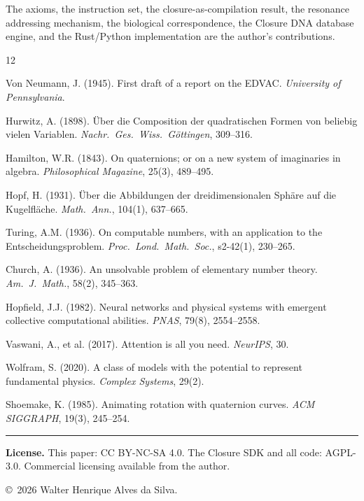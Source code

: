 \documentclass[12pt,a4paper]{article}
\begin{document}
The axioms, the instruction set, the closure-as-compilation result, the resonance addressing mechanism, the biological correspondence, the Closure DNA database engine, and the Rust/Python implementation are the author's contributions.


\begin{thebibliography}{12}

Von Neumann, J. (1945). First draft of a report on the EDVAC. \textit{University of Pennsylvania}.

Hurwitz, A. (1898). \"{U}ber die Composition der quadratischen Formen von beliebig vielen Variablen. \textit{Nachr.\ Ges.\ Wiss.\ G\"{o}ttingen}, 309--316.

Hamilton, W.R. (1843). On quaternions; or on a new system of imaginaries in algebra. \textit{Philosophical Magazine}, 25(3), 489--495.

Hopf, H. (1931). \"{U}ber die Abbildungen der dreidimensionalen Sph\"{a}re auf die Kugelfl\"{a}che. \textit{Math.\ Ann.}, 104(1), 637--665.

Turing, A.M. (1936). On computable numbers, with an application to the Entscheidungsproblem. \textit{Proc.\ Lond.\ Math.\ Soc.}, s2-42(1), 230--265.

Church, A. (1936). An unsolvable problem of elementary number theory. \textit{Am.\ J.\ Math.}, 58(2), 345--363.

Hopfield, J.J. (1982). Neural networks and physical systems with emergent collective computational abilities. \textit{PNAS}, 79(8), 2554--2558.

Vaswani, A., et al. (2017). Attention is all you need. \textit{NeurIPS}, 30.

Wolfram, S. (2020). A class of models with the potential to represent fundamental physics. \textit{Complex Systems}, 29(2).

Shoemake, K. (1985). Animating rotation with quaternion curves. \textit{ACM SIGGRAPH}, 19(3), 245--254.

\end{thebibliography}

\vspace{1em}
\noindent\rule{\textwidth}{0.4pt}

\noindent\textbf{License.} This paper: CC BY-NC-SA 4.0. The Closure SDK and all code: AGPL-3.0. Commercial licensing available from the author.

\noindent\copyright\ 2026 Walter Henrique Alves da Silva.
\end{document}
